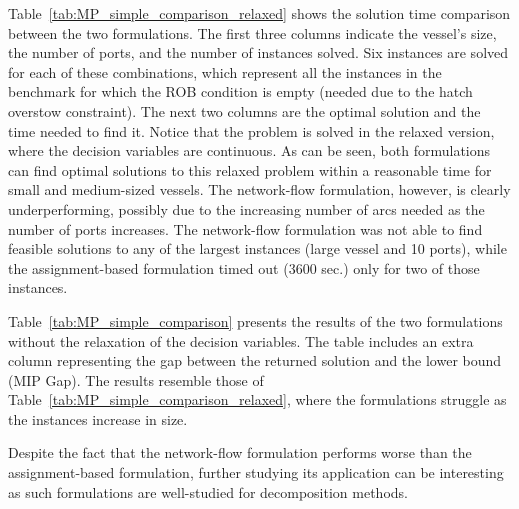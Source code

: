 \documentclass[preprint,12pt,authoryear]{elsarticle}
\begin{document}
Table~\ref{tab:MP_simple_comparison_relaxed} shows the solution time comparison between the two formulations. The first three columns indicate the vessel's size, the number of ports, and the number of instances solved. Six instances are solved for each of these combinations, which represent all the instances in the benchmark for which the ROB condition is empty (needed due to the hatch overstow constraint). The next two columns are the optimal solution and the time needed to find it. Notice that the problem is solved in the relaxed version, where the decision variables are continuous. As can be seen, both formulations can find optimal solutions to this relaxed problem within a reasonable time for small and medium-sized vessels. The network-flow formulation, however, is clearly underperforming, possibly due to the increasing number of arcs needed as the number of ports increases. The network-flow formulation was not able to find feasible solutions to any of the largest instances (large vessel and 10 ports), while the assignment-based formulation timed out (3600 sec.) only for two of those instances. 

Table~\ref{tab:MP_simple_comparison} presents the results of the two formulations without the relaxation of the decision variables. The table includes an extra column representing the gap between the returned solution and the lower bound (MIP Gap). The results resemble those of Table~\ref{tab:MP_simple_comparison_relaxed}, where the formulations struggle as the instances increase in size.

Despite the fact that the network-flow formulation performs worse than the assignment-based formulation, further studying its application can be interesting as such formulations are well-studied for decomposition methods.
\end{document}
